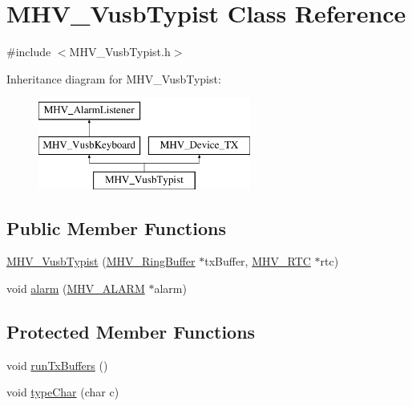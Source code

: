 \hypertarget{class_m_h_v___vusb_typist}{
\section{\-M\-H\-V\-\_\-\-Vusb\-Typist \-Class \-Reference}
\label{class_m_h_v___vusb_typist}
}


{\ttfamily \#include $<$\-M\-H\-V\-\_\-\-Vusb\-Typist.\-h$>$}

\-Inheritance diagram for \-M\-H\-V\-\_\-\-Vusb\-Typist\-:\begin{figure}[H]
\begin{center}
\leavevmode
\includegraphics[height=3.000000cm]{class_m_h_v___vusb_typist}
\end{center}
\end{figure}
\subsection*{\-Public \-Member \-Functions}
\begin{DoxyCompactItemize}
\item 
\hyperlink{class_m_h_v___vusb_typist_aa7aa56757c89c6178aa49cfcda74906c}{\-M\-H\-V\-\_\-\-Vusb\-Typist} (\hyperlink{class_m_h_v___ring_buffer}{\-M\-H\-V\-\_\-\-Ring\-Buffer} $\ast$tx\-Buffer, \hyperlink{class_m_h_v___r_t_c}{\-M\-H\-V\-\_\-\-R\-T\-C} $\ast$rtc)
\item 
void \hyperlink{class_m_h_v___vusb_typist_a2c75524f75cd93876648da3ebd90b529}{alarm} (\hyperlink{_m_h_v___r_t_c_8h_af13307658f41fba330ffae04dd5cbce6}{\-M\-H\-V\-\_\-\-A\-L\-A\-R\-M} $\ast$alarm)
\end{DoxyCompactItemize}
\subsection*{\-Protected \-Member \-Functions}
\begin{DoxyCompactItemize}
\item 
void \hyperlink{class_m_h_v___vusb_typist_a171cec2829ab07c838ffda3e7c3b9871}{run\-Tx\-Buffers} ()
\item 
void \hyperlink{class_m_h_v___vusb_typist_a20f527471b7f3a907d3969eaf4a04689}{type\-Char} (char c)
\end{DoxyCompactItemize}
